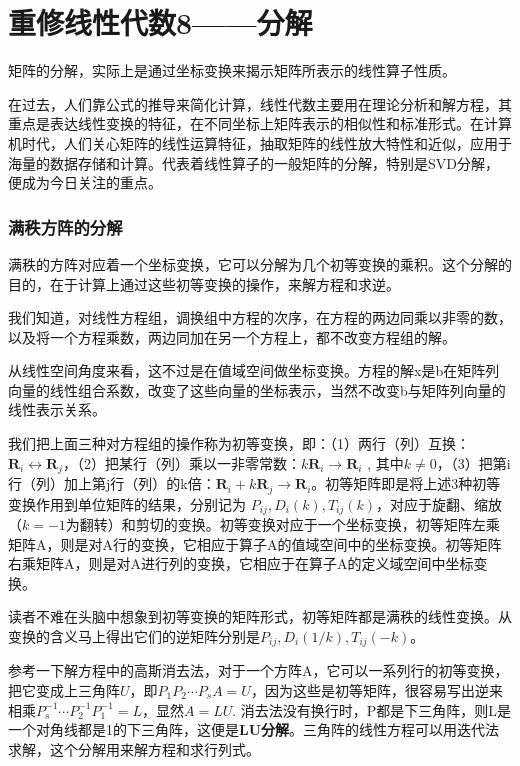 \chapter{重修线性代数8——分解 }
矩阵的分解，实际上是通过坐标变换来揭示矩阵所表示的线性算子性质。

在过去，人们靠公式的推导来简化计算，线性代数主要用在理论分析和解方程，其重点是表达线性变换的特征，在不同坐标上矩阵表示的相似性和标准形式。在计算机时代，人们关心矩阵的线性运算特征，抽取矩阵的线性放大特性和近似，应用于海量的数据存储和计算。代表着线性算子的一般矩阵的分解，特别是SVD分解，便成为今日关注的重点。

\subsection{满秩方阵的分解}
满秩的方阵对应着一个坐标变换，它可以分解为几个初等变换的乘积。这个分解的目的，在于计算上通过这些初等变换的操作，来解方程和求逆。

我们知道，对线性方程组，调换组中方程的次序，在方程的两边同乘以非零的数，以及将一个方程乘数，两边同加在另一个方程上，都不改变方程组的解。

从线性空间角度来看，这不过是在值域空间做坐标变换。方程的解x是b在矩阵列向量的线性组合系数，改变了这些向量的坐标表示，当然不改变b与矩阵列向量的线性表示关系。

我们把上面三种对方程组的操作称为初等变换，即：（1）两行（列）互换：$ \bm{R}_{i} \leftrightarrow \bm{R}_{j} $，（2）把某行（列）乘以一非零常数：$ k\bm{R}_{i}\rightarrow \bm{R}_{i} $ , 其中$ k\neq0 $，（3）把第i行（列）加上第j行（列）的k倍：$ \bm{R}_{i} + k\bm{R}_{j}\rightarrow \bm{R}_{i} $。初等矩阵即是将上述3种初等变换作用到单位矩阵的结果，分别记为  $ P_{ij},D_{i}(k),T_{ij}(k) $，对应于旋翻、缩放（$ k=-1 $为翻转）和剪切的变换。初等变换对应于一个坐标变换，初等矩阵左乘矩阵A，则是对A行的变换，它相应于算子A的值域空间中的坐标变换。初等矩阵右乘矩阵A，则是对A进行列的变换，它相应于在算子A的定义域空间中坐标变换。

读者不难在头脑中想象到初等变换的矩阵形式，初等矩阵都是满秩的线性变换。从变换的含义马上得出它们的逆矩阵分别是$ P_{ij},D_{i}(1/k),T_{ij}(-k) $。

参考一下解方程中的高斯消去法，对于一个方阵A，它可以一系列行的初等变换，把它变成上三角阵$ U $，即$ P_{1}P_{2}\cdots P_{s}A=U $，因为这些是初等矩阵，很容易写出逆来相乘$ P_{s}^{-1}\cdots P_{2}^{-1}P_{1}^{-1}=L $，显然$ A = LU $. 消去法没有换行时，P都是下三角阵，则L是一个对角线都是1的下三角阵，这便是\textbf{LU分解}。三角阵的线性方程可以用迭代法求解，这个分解用来解方程和求行列式。

